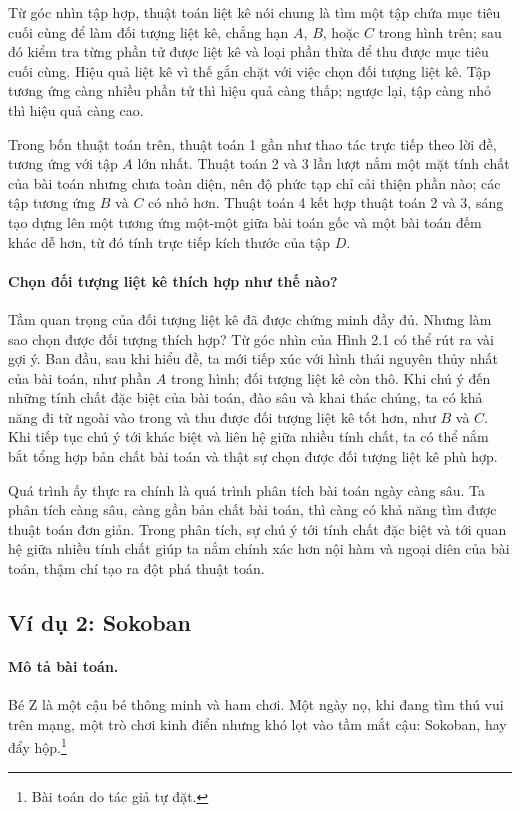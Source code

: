\documentclass[11pt]{article}
\begin{document}
Từ góc nhìn tập hợp, thuật toán liệt kê nói chung là tìm một tập chứa mục tiêu
cuối cùng để làm đối tượng liệt kê, chẳng hạn \(A\), \(B\), hoặc \(C\) trong
hình trên; sau đó kiểm tra từng phần tử được liệt kê và loại phần thừa để thu
được mục tiêu cuối cùng. Hiệu quả liệt kê vì thế gắn chặt với việc chọn đối
tượng liệt kê. Tập tương ứng càng nhiều phần tử thì hiệu quả càng thấp; ngược
lại, tập càng nhỏ thì hiệu quả càng cao.

Trong bốn thuật toán trên, thuật toán 1 gần như thao tác trực tiếp theo lời
đề, tương ứng với tập \(A\) lớn nhất. Thuật toán 2 và 3 lần lượt nắm một mặt
tính chất của bài toán nhưng chưa toàn diện, nên độ phức tạp chỉ cải thiện
phần nào; các tập tương ứng \(B\) và \(C\) có nhỏ hơn. Thuật toán 4 kết hợp
thuật toán 2 và 3, sáng tạo dựng lên một tương ứng một-một giữa bài toán gốc
và một bài toán đếm khác dễ hơn, từ đó tính trực tiếp kích thước của tập \(D\).

\paragraph{Chọn đối tượng liệt kê thích hợp như thế nào?}
Tầm quan trọng của đối tượng liệt kê đã được chứng minh đầy đủ. Nhưng làm sao
chọn được đối tượng thích hợp? Từ góc nhìn của Hình 2.1 có thể rút ra vài gợi
ý. Ban đầu, sau khi hiểu đề, ta mới tiếp xúc với hình thái nguyên thủy nhất
của bài toán, như phần \(A\) trong hình; đối tượng liệt kê còn thô. Khi chú ý
đến những tính chất đặc biệt của bài toán, đào sâu và khai thác chúng, ta có
khả năng đi từ ngoài vào trong và thu được đối tượng liệt kê tốt hơn, như
\(B\) và \(C\). Khi tiếp tục chú ý tới khác biệt và liên hệ giữa nhiều tính
chất, ta có thể nắm bắt tổng hợp bản chất bài toán và thật sự chọn được đối
tượng liệt kê phù hợp.

Quá trình ấy thực ra chính là quá trình phân tích bài toán ngày càng sâu. Ta
phân tích càng sâu, càng gần bản chất bài toán, thì càng có khả năng tìm được
thuật toán đơn giản. Trong phân tích, sự chú ý tới tính chất đặc biệt và tới
quan hệ giữa nhiều tính chất giúp ta nắm chính xác hơn nội hàm và ngoại diên
của bài toán, thậm chí tạo ra đột phá thuật toán.

\subsection{Ví dụ 2: Sokoban}

\paragraph{Mô tả bài toán.}
Bé Z là một cậu bé thông minh và ham chơi. Một ngày nọ, khi đang tìm thú vui
trên mạng, một trò chơi kinh điển nhưng khó lọt vào tầm mắt cậu: Sokoban, hay
đẩy hộp.\footnote{Bài toán do tác giả tự đặt.}
\end{document}
